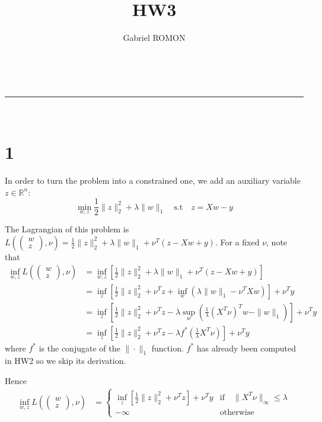 \documentclass[a4paper,11pt]{article}
\makeatletter
\newcommand{\linia}{\rule{\linewidth}{0.5pt}}
\renewcommand{\maketitle}{
\begin{center}
\vspace{2ex}
{\huge \textsc{\@title}}
\vspace{1ex}
\\
\linia\\
\@author 
\vspace{4ex}
\end{center}
}
\makeatother
\begin{document}
\title{HW3}

\author{Gabriel ROMON}



\maketitle

\section*{1}

In order to turn the problem into a constrained one, we add an auxiliary variable $z\in \mathbb R^n$: $$\min_{w,z} \frac 12 \|z\|_2^2 + \lambda \|w\|_1 \quad \text{s.t} \quad z = Xw-y$$

The Lagrangian of this problem is $\displaystyle L\left(\begin{pmatrix}w\\z \end{pmatrix}, \nu\right) = \frac 12 \|z\|_2^2 + \lambda \|w\|_1 + \nu^T(z-Xw+y)$.\newline
For a fixed $\nu$, note that $$\begin{aligned}\inf_{w,z} L\left(\begin{pmatrix}w\\z \end{pmatrix}, \nu\right) 
&= \inf_{w,z} \left[\frac 12 \|z\|_2^2 + \lambda \|w\|_1 + \nu^T(z-Xw+y) \right] \\
&= \inf_z \left[ \frac 12 \|z\|_2^2 + \nu^Tz  + \inf_w(\lambda \|w\|_1 - \nu^TXw)\right] + \nu^Ty\\
&= \inf_z \left[ \frac 12 \|z\|_2^2 + \nu^Tz  -\lambda \sup_w(\frac{1}{\lambda}(X^T\nu)^Tw - \|w\|_1 )\right] + \nu^Ty\\
&= \inf_z \left[ \frac 12 \|z\|_2^2 + \nu^Tz  -\lambda f^*(\frac{1}{\lambda}X^T\nu)\right] + \nu^Ty
\end{aligned}$$ 
where $f^*$ is the conjugate of the $\|\cdot\|_1$ function. $f^*$ has already been computed in HW2 so we skip its derivation.

Hence $$\begin{aligned}\inf_{w,z} L\left(\begin{pmatrix}w\\z \end{pmatrix}, \nu\right) 
&= \begin{cases}\inf_z \left[ \frac 12 \|z\|_2^2 + \nu^Tz \right] + \nu^Ty &\text{if} \quad \|X^T\nu\|_{\infty} \leq \lambda \\
-\infty &\text{otherwise}
\end{cases}
\end{aligned}$$ 
\end{document}
